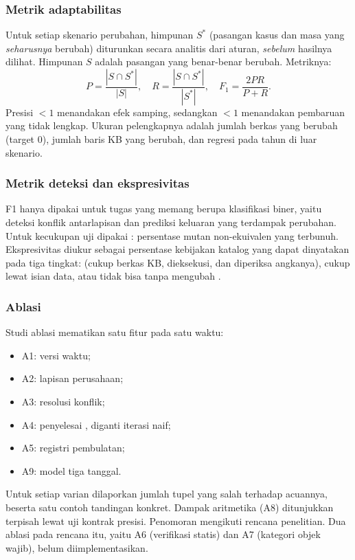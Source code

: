 \subsubsection{Metrik adaptabilitas}
Untuk setiap skenario perubahan, himpunan $S^{*}$ (pasangan kasus dan masa yang \emph{seharusnya} berubah) diturunkan secara analitis dari aturan, \emph{sebelum} hasilnya dilihat. Himpunan $S$ adalah pasangan yang benar-benar berubah. Metriknya:
\begin{equation}
P = \frac{|S \cap S^{*}|}{|S|},\quad R = \frac{|S \cap S^{*}|}{|S^{*}|},\quad F_1 = \frac{2PR}{P+R}.
\end{equation}
Presisi $<1$ menandakan efek samping, sedangkan  $<1$ menandakan pembaruan yang tidak lengkap. Ukuran pelengkapnya adalah jumlah berkas  yang berubah (target 0), jumlah baris KB yang berubah, dan regresi pada tahun di luar skenario.

\subsubsection{Metrik deteksi dan ekspresivitas}
F1 hanya dipakai untuk tugas yang memang berupa klasifikasi biner, yaitu deteksi konflik antarlapisan dan prediksi keluaran yang terdampak perubahan. Untuk kecukupan uji dipakai : persentase mutan non-ekuivalen yang terbunuh. Ekspresivitas diukur sebagai persentase kebijakan katalog yang dapat dinyatakan pada tiga tingkat:  (cukup berkas KB, dieksekusi, dan diperiksa angkanya), cukup lewat isian data, atau tidak bisa tanpa mengubah .

\subsubsection{Ablasi}
Studi ablasi mematikan satu fitur pada satu waktu:
\begin{itemize}[leftmargin=*,nosep]
  \item A1: versi waktu;
  \item A2: lapisan perusahaan;
  \item A3: resolusi konflik;
  \item A4: penyelesai , diganti iterasi naif;
  \item A5: registri pembulatan;
  \item A9: model tiga tanggal.
\end{itemize}
Untuk setiap varian dilaporkan jumlah tupel yang salah terhadap acuannya, beserta satu contoh tandingan konkret. Dampak aritmetika  (A8) ditunjukkan terpisah lewat uji kontrak presisi. Penomoran mengikuti rencana penelitian. Dua ablasi pada rencana itu, yaitu A6 (verifikasi statis) dan A7 (kategori objek wajib), belum diimplementasikan.

